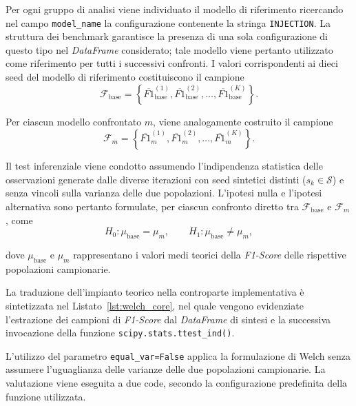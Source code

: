 Per ogni gruppo di analisi viene individuato il modello di riferimento ricercando nel campo \texttt{model\_name} la configurazione contenente la stringa \texttt{INJECTION}. 
La struttura dei benchmark garantisce la presenza di una sola configurazione di questo tipo nel \textit{DataFrame} considerato; tale modello viene pertanto utilizzato come riferimento per tutti i successivi confronti. 
I valori corrispondenti ai dieci seed del modello di riferimento costituiscono il campione
\begin{equation}
\mathcal{F}_{\text{base}}
=
\left\{
\overline{F1}_{\text{base}}^{(1)},
\overline{F1}_{\text{base}}^{(2)},
\ldots,
\overline{F1}_{\text{base}}^{(K)}
\right\}.
\label{eq:welch_reference_sample}
\end{equation}

Per ciascun modello confrontato $m$, viene analogamente costruito il campione
\begin{equation}
\mathcal{F}_{m}
=
\left\{
\overline{F1}_{m}^{(1)},
\overline{F1}_{m}^{(2)},
\ldots,
\overline{F1}_{m}^{(K)}
\right\}.
\label{eq:welch_model_sample}
\end{equation}

Il test inferenziale viene condotto assumendo l'indipendenza statistica delle osservazioni generate dalle diverse iterazioni con seed sintetici distinti ($s_k \in \mathcal{S}$) e senza vincoli sulla varianza delle due popolazioni. L'ipotesi nulla e l'ipotesi alternativa sono pertanto formulate, per ciascun confronto diretto tra $\mathcal{F}_{\text{base}}$ e $\mathcal{F}_{m}$, come
\begin{equation}
H_0:
\mu_{\text{base}} = \mu_m,
\qquad
H_1:
\mu_{\text{base}} \neq \mu_m,
\label{eq:welch_hypotheses}
\end{equation}

dove $\mu_{\text{base}}$ e $\mu_m$ rappresentano i valori medi teorici della \textit{F1-Score} delle rispettive popolazioni campionarie. 

La traduzione dell'impianto teorico nella controparte implementativa è sintetizzata nel Listato~\ref{lst:welch_core}, nel quale vengono evidenziate l'estrazione dei campioni di \textit{F1-Score} dal \textit{DataFrame} di sintesi e la successiva invocazione della funzione \texttt{scipy.stats.ttest\_ind()}.

L'utilizzo del parametro \texttt{equal\_var=False} applica la formulazione di Welch senza assumere l'uguaglianza delle varianze delle due popolazioni campionarie. 
La valutazione viene eseguita a due code, secondo la configurazione predefinita della funzione utilizzata.

